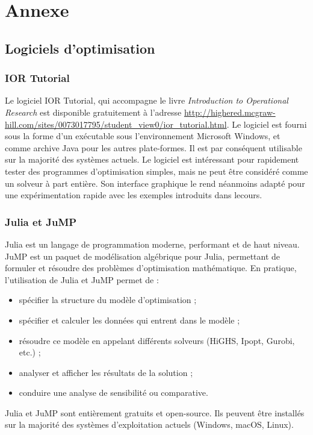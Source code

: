\chapter{Annexe}

\section{Logiciels d'optimisation}

\subsection{IOR Tutorial}

Le logiciel IOR Tutorial, qui accompagne le livre {\sl Introduction to Operational Research} \citep{HillLieb01} est disponible gratuitement à l'adresse \url{http://highered.mcgraw-hill.com/sites/0073017795/student_view0/ior_tutorial.html}.
Le logiciel est fourni sous la forme d'un exécutable sous l'environnement Microsoft Windows, et comme archive Java pour les autres plate-formes.
Il est par conséquent utilisable sur la majorité des systèmes actuels.
Le logiciel est intéressant pour rapidement tester des programmes d'optimisation simples, mais ne peut être considéré comme un solveur à part entière.
Son interface graphique le rend néanmoins adapté pour une expérimentation rapide avec les exemples introduits dans lecours.

\subsection{Julia et JuMP}

Julia est un langage de programmation moderne, performant et de haut niveau. JuMP est un paquet de modélisation algébrique pour Julia, permettant de formuler et résoudre des problèmes d'optimisation mathématique.
En pratique, l'utilisation de Julia et JuMP permet de :
\begin{itemize}
\item
spécifier la structure du modèle d'optimisation ;
\item
spécifier et calculer les données qui entrent dans le modèle ;
\item
résoudre ce modèle en appelant différents solveurs (HiGHS, Ipopt, Gurobi, etc.) ;
\item
analyser et afficher les résultats de la solution ;
\item
conduire une analyse de sensibilité ou comparative.
\end{itemize}
Julia et JuMP sont entièrement gratuits et open-source. Ils peuvent être installés sur la majorité des systèmes d'exploitation actuels (Windows, macOS, Linux).


